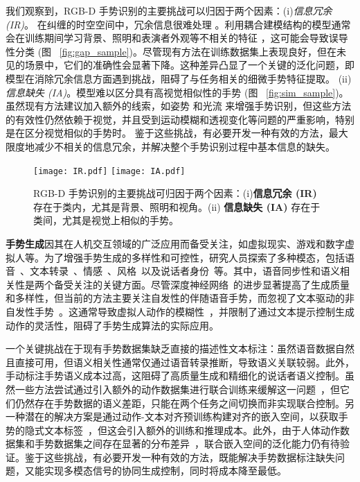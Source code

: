 我们观察到，RGB-D 手势识别的主要挑战可以归因于两个因素：(i)\textit{信息冗余 (IR)}。
在纠缠的时空空间中，冗余信息很难处理 \cite{zhou2023unified, LI2024110536}。利用耦合建模结构的模型通常会在训练期间学习背景、照明和表演者外观等不相关的特征 \cite{zhou2023unified}，这可能会导致误导性分类 (图 ~\ref{fig:gap_sample})。尽管现有方法在训练数据集上表现良好，但在未见的场景中，它们的准确性会显著下降。这种差异凸显了一个关键的泛化问题，即模型在消除冗余信息方面遇到挑战，阻碍了与任务相关的细微手势特征提取。
(ii)\textit{信息缺失 (IA)}。模型难以区分具有高视觉相似性的手势 (图 ~\ref{fig:sim_sample})。虽然现有方法建议加入额外的线索，如姿势 \cite{wan2016chalearn,zuo2023natural} 和光流 \cite{narayana2018focus} 来增强手势识别，但这些方法的有效性仍然依赖于视觉，并且受到运动模糊和透视变化等问题的严重影响，特别是在区分视觉相似的手势时。
鉴于这些挑战，有必要开发一种有效的方法，最大限度地减少不相关的信息冗余，并解决整个手势识别过程中基本信息的缺失。

\begin{figure}[tb]
  \centering
  {\texttt{[image: IR.pdf]}}
  {\texttt{[image: IA.pdf]}}
  \caption{RGB-D 手势识别的主要挑战可归因于两个因素：(i)\textbf{信息冗余 (IR)} 存在于类内，尤其是背景、照明和视角。(ii) \textbf{信息缺失 (IA)} 存在于类间，尤其是视觉上相似的手势。}
  \label{fig:samples}
  \end{figure}


\textbf{手势生成}因其在人机交互领域的广泛应用而备受关注，如虚拟现实、游戏和数字虚拟人等。为了增强手势生成的多样性和可控性，研究人员探索了多种模态，包括语音~\cite{yang2023diffusestylegesture, yang2023unifiedgesture,xu2025mambatalk}、文本转录~\cite{zhi2023livelyspeaker, pang2023bodyformer,liu2024emage}、情感~\cite{qi2024emotiongesture, qi2024weakly}、风格~\cite{ao2023gesturediffuclip, yang2023diffusestylegesture, ghorbani2023zeroeggs}以及说话者身份~\cite{yang2023diffusestylegesture+}等。其中，语音同步性和语义相关性是两个备受关注的关键方面。尽管深度神经网络~\cite{liu2024emage, xu2025mambatalk, cheng2024siggesture}的进步显著提高了生成质量和多样性，但当前的方法主要关注自发性的伴随语音手势，而忽视了文本驱动的非自发性手势~\cite{yang2024freetalker}。这通常导致虚拟人动作的模糊性~\cite{chen2024syntalker}，并限制了通过文本提示控制生成动作的灵活性，阻碍了手势生成算法的实际应用。

一个关键挑战在于现有手势数据集缺乏直接的描述性文本标注：虽然语音数据自然且直接可用，但语义相关性通常仅通过语音转录推断，导致语义关联较弱。此外，手动标注手势语义成本过高，这阻碍了高质量生成和精细化的说话者语义控制。虽然一些方法尝试通过引入额外的动作数据集进行联合训练来缓解这一问题~\cite{yang2024freetalker}，但它们仍然存在手势数据的语义差距，只能在两个任务之间切换而非实现联合控制。另一种潜在的解决方案是通过动作-文本对齐预训练构建对齐的嵌入空间，以获取手势的隐式文本标签~\cite{chen2024syntalker}，但这会引入额外的训练和推理成本。此外，由于人体动作数据集和手势数据集之间存在显著的分布差异~\cite{chen2024syntalker}，联合嵌入空间的泛化能力仍有待验证。鉴于这些挑战，有必要开发一种有效的方法，既能解决手势数据标注缺失问题，又能实现多模态信号的协同生成控制，同时将成本降至最低。



